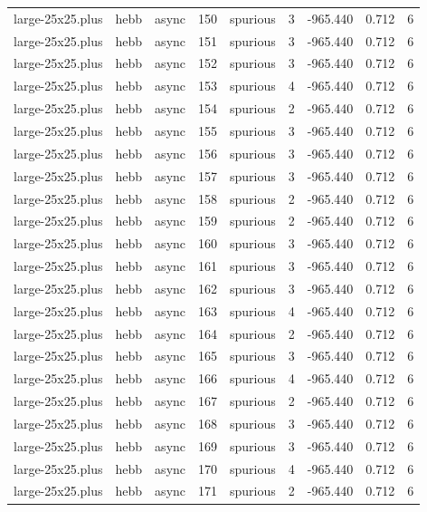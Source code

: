\begin{tabular}{lllrlrrrr}
large-25x25.plus & hebb & async & 150 & spurious & 3 & -965.440 & 0.712 & 6 \\
large-25x25.plus & hebb & async & 151 & spurious & 3 & -965.440 & 0.712 & 6 \\
large-25x25.plus & hebb & async & 152 & spurious & 3 & -965.440 & 0.712 & 6 \\
large-25x25.plus & hebb & async & 153 & spurious & 4 & -965.440 & 0.712 & 6 \\
large-25x25.plus & hebb & async & 154 & spurious & 2 & -965.440 & 0.712 & 6 \\
large-25x25.plus & hebb & async & 155 & spurious & 3 & -965.440 & 0.712 & 6 \\
large-25x25.plus & hebb & async & 156 & spurious & 3 & -965.440 & 0.712 & 6 \\
large-25x25.plus & hebb & async & 157 & spurious & 3 & -965.440 & 0.712 & 6 \\
large-25x25.plus & hebb & async & 158 & spurious & 2 & -965.440 & 0.712 & 6 \\
large-25x25.plus & hebb & async & 159 & spurious & 2 & -965.440 & 0.712 & 6 \\
large-25x25.plus & hebb & async & 160 & spurious & 3 & -965.440 & 0.712 & 6 \\
large-25x25.plus & hebb & async & 161 & spurious & 3 & -965.440 & 0.712 & 6 \\
large-25x25.plus & hebb & async & 162 & spurious & 3 & -965.440 & 0.712 & 6 \\
large-25x25.plus & hebb & async & 163 & spurious & 4 & -965.440 & 0.712 & 6 \\
large-25x25.plus & hebb & async & 164 & spurious & 2 & -965.440 & 0.712 & 6 \\
large-25x25.plus & hebb & async & 165 & spurious & 3 & -965.440 & 0.712 & 6 \\
large-25x25.plus & hebb & async & 166 & spurious & 4 & -965.440 & 0.712 & 6 \\
large-25x25.plus & hebb & async & 167 & spurious & 2 & -965.440 & 0.712 & 6 \\
large-25x25.plus & hebb & async & 168 & spurious & 3 & -965.440 & 0.712 & 6 \\
large-25x25.plus & hebb & async & 169 & spurious & 3 & -965.440 & 0.712 & 6 \\
large-25x25.plus & hebb & async & 170 & spurious & 4 & -965.440 & 0.712 & 6 \\
large-25x25.plus & hebb & async & 171 & spurious & 2 & -965.440 & 0.712 & 6 \\

\end{tabular}
